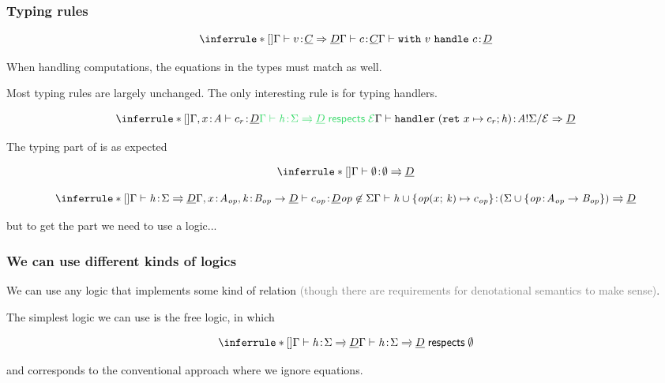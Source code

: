 \documentclass[usenames,dvipsnames]{beamer}
\begin{document}
\begin{frame}
	\frametitle{Typing rules}

	\[
		\inferrule*[]
		{ \judgement{\ctx}{v}{\ctyC \hto \ctyD}\\
			\judgement{\ctx}{c}{\ctyC}
		}
		{ \judgement{\ctx}{\withhandle{v}{c}}{\ctyD}
		}	
	\]

	When handling computations, the equations in the types must match as well.
	\vspace{5mm}

	Most typing rules are largely unchanged. The only interesting rule is for typing handlers.

	\[
	\inferrule*[]
	{
		\judgement{\ctx, x \oftype \tyA}{c_r}{\ctyD}
		\\
		\new{\respects{\hcases}{\eqE}{\sig}{\ctyD}}
		\\
	}
	{\judgement{\ctx}
		{\handler{\hcases}}
		{\ctype{\tyA}{\sig}{\eqE} \hto \ctyD}
	}
	\]
\end{frame}
\begin{frame}
	The typing part of \new{$\respects{\hcases}{\eqE}{\sig}{\ctyD}$} is as expected

	\[
			\inferrule*[]{	}
			{\judgement{\ctx}
				{\emptyhcases}
				{\nil \casesto {\ctyD}}
			}
	\]

	\[
			\inferrule*[]
			{\judgement{\ctx}
				{\hcases}
				{\sig \casesto {\ctyD}}\\
				\judgement{\ctx, x \oftype \tyA_{\op}, \contin \oftype \tyB_{\op} \to \ctyD}
				{c_{\op}}
				{\ctyD}\\
				\op \not \in \sig
			}
			{\judgement{\ctx}
				{\hcases \union \set{\operation{x}{\contin} \mapsto c_{\op}}}
				{(\sig \union \set{\op \oftype \tyA_{\op} \to \tyB_{\op}}) \casesto {\ctyD}}
			}
	\]

	but to get the  part we need to use a logic...
\end{frame}
\begin{frame}
	\frametitle{We can use different kinds of logics}
	We can use any logic that implements some kind of  relation \textcolor{gray}{(though there are requirements for denotational semantics to make sense)}.
	\vspace{5mm}
	
	The simplest logic we can use is the free logic, in which

	\[
	\inferrule*[]
	{ \welltyped{\hcases}{\sig \casesto \ctyD} }
	{ \respects{\hcases}{\nil}{\sig}{\ctyD} }
	\]

	and corresponds to the conventional approach where we ignore equations.
\end{frame}
\end{document}
